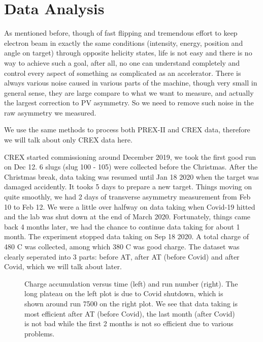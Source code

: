 \chapter{Data Analysis}
As mentioned before, though of fast flipping and tremendous effort to keep electron beam in exactly
the same conditions (intensity, energy, position and angle on target) through 
opposite helicity states, life is not easy and there is no way to achieve such
a goal, after all, no one can understand completely and control every aspect of
something as complicated as an accelerator. There is always various noise caused
in various parts of the machine, though very small in general sense, they are
large compare to what we want to measure, and actually the largest correction
to PV asymmetry. So we need to remove such noise in the raw asymmetry we measured.

We use the same methods to process both PREX-II and CREX data, therefore we will
talk about only CREX data here.

CREX started commissioning around December 2019, we took the first good run on 
Dec 12. 6 slugs (slug 100 - 105) were collected before the Christmas. After 
the Christmas break, data taking was resumed until Jan 18 2020 when the \Ca 
target was damaged accidently. It tooks 5 days to prepare a new \Ca target.
Things moving on quite smoothly, we had 2 days of transverse asymmetry 
measurement from Feb 10 to Feb 12. We were a little over halfway on data taking 
when Covid-19 hitted and the lab was shut down at the end of March 2020. Fortunately,
things came back 4 months later, we had the chance to continue data taking for
about 1 month. The experiment stopped data taking on Sep 18 2020. A total charge
of 480 C was collected, among which 380 C was good charge. The dataset was clearly
seperated into 3 parts: before AT, after AT (before Covid) and after Covid, which
we will talk about later.
\begin{figure}[h!]
    \caption{Charge accumulation versus time (left) and run number (right). The
    long plateau on the left plot is due to Covid shutdown, which is shown around
    run 7500 on the right plot. We see that data taking is most efficient after
    AT (before Covid), the last month (after Covid) is not bad while the 
    first 2 months is not so efficient due to various problems.}
\end{figure}

